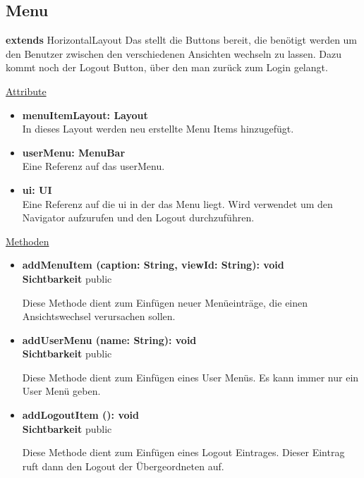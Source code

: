 \newpage
\subsection{Menu}\label{Menu}
\textbf{extends}  HorizontalLayout \newline
Das  stellt die Buttons bereit, die benötigt werden um den Benutzer zwischen den verschiedenen Ansichten wechseln zu lassen. Dazu kommt noch der Logout Button, über den man zurück zum Login gelangt.
\newline

\underline{Attribute}
\begin{itemize}
\itemsep0pt

\item \textbf{menuItemLayout: Layout} \hfill\\ 
In dieses Layout werden neu erstellte Menu Items hinzugefügt.

\item \textbf{userMenu: MenuBar} \hfill\\ 
Eine Referenz auf das userMenu.

\item \textbf{ui: UI} \hfill\\ 
Eine Referenz auf die ui in der das Menu liegt. Wird verwendet um den Navigator aufzurufen und den Logout durchzuführen.

\end{itemize}

\underline{Methoden}
\begin{itemize}
\itemsep0pt
\item \textbf{addMenuItem (caption: String, viewId: String): void}\hfill\\
\textbf{Sichtbarkeit} public

Diese Methode dient zum Einfügen neuer Menüeinträge, die einen Ansichtswechsel verursachen sollen.

\item \textbf{addUserMenu (name: String): void}\hfill\\
\textbf{Sichtbarkeit} public

Diese Methode dient zum Einfügen eines User Menüs. Es kann immer nur ein User Menü geben.

\item \textbf{addLogoutItem (): void}\hfill\\
\textbf{Sichtbarkeit} public

Diese Methode dient zum Einfügen eines Logout Eintrages. Dieser Eintrag ruft dann den Logout der Übergeordneten  auf.

\end{itemize}